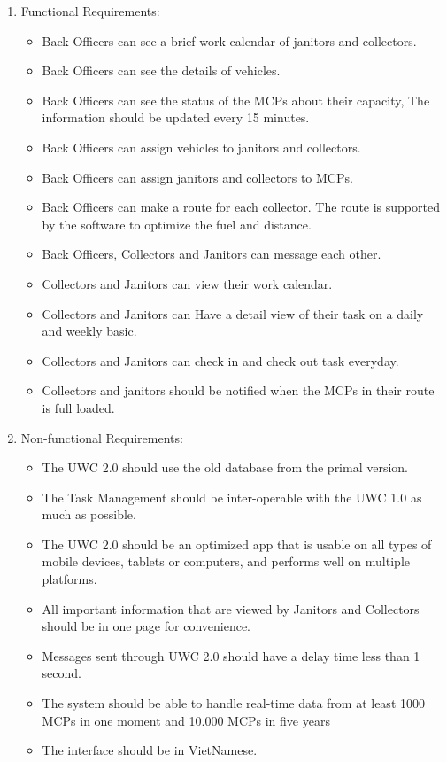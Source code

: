 \documentclass[a4paper]{article}
\begin{document}
\begin{enumerate}
\item Functional Requirements: 
\begin{itemize}
            \item 	Back Officers can see a brief work calendar of  janitors and collectors.
            \item	Back Officers can see the details of vehicles.
            \item	Back Officers can see the status of the MCPs about their capacity, The information should be updated every 15 minutes.
            \item	Back Officers can assign vehicles to janitors and collectors.
            \item	Back Officers can assign janitors and collectors to MCPs.
            \item	Back Officers can make a route for each collector. The route is supported by the software to optimize the fuel and distance.
            \item	Back Officers, Collectors and Janitors can message each other.
            \item	Collectors and Janitors can view their work calendar.
            \item	Collectors and Janitors can Have a detail view of their task on a daily and weekly basic.
            \item	Collectors and Janitors can check in and check out task everyday.
            \item	Collectors and janitors should be notified when the MCPs in their route is full loaded.
\end{itemize}
\item Non-functional Requirements:
\begin{itemize}
	        \item The UWC 2.0 should use the old database from the primal version.
	        \item The Task Management should be inter-operable with the UWC 1.0 as much as possible.
	        \item The UWC 2.0 should be an optimized app that is usable on all types of mobile devices, tablets or computers, and performs well on multiple platforms.
	        \item All important information that are viewed by Janitors and Collectors should be in one page for convenience.
        	\item Messages sent through UWC 2.0 should have a delay time less than 1 second.
	        \item The system should be able to handle real-time data from at least 1000 MCPs in one moment and 10.000 MCPs in five years
        	\item The interface should be in VietNamese.
\end{itemize}
\end{enumerate}
\end{document}
